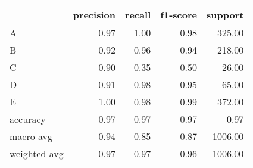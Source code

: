 \begin{tabular}{|l|r|r|r|r|}
\hline
{} &  precision &  recall &  f1-score &  support \\
\hline
A            &       0.97 &    1.00 &      0.98 &   325.00 \\
B            &       0.92 &    0.96 &      0.94 &   218.00 \\
C            &       0.90 &    0.35 &      0.50 &    26.00 \\
D            &       0.91 &    0.98 &      0.95 &    65.00 \\
E            &       1.00 &    0.98 &      0.99 &   372.00 \\
accuracy     &       0.97 &    0.97 &      0.97 &     0.97 \\
macro avg    &       0.94 &    0.85 &      0.87 &  1006.00 \\
weighted avg &       0.97 &    0.97 &      0.96 &  1006.00 \\
\hline
\end{tabular}
